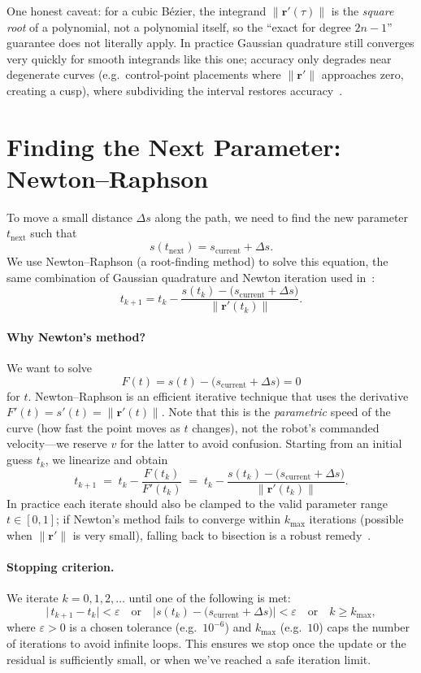 \documentclass[11pt]{article}
\begin{document}
One honest caveat: for a cubic B\'ezier, the integrand \(\|\mathbf r'(\tau)\|\) is the \emph{square root} of a polynomial, not a polynomial itself, so the ``exact for degree \(2n-1\)'' guarantee does not literally apply. In practice Gaussian quadrature still converges very quickly for smooth integrands like this one; accuracy only degrades near degenerate curves (e.g.\ control-point placements where \(\|\mathbf r'\|\) approaches zero, creating a cusp), where subdividing the interval restores accuracy~\cite{wang}.


\section{Finding the Next Parameter: Newton–Raphson}

To move a small distance \(\Delta s\) along the path, we need to find the new parameter \(t_{\text{next}}\) such that 
\[
s(t_{\text{next}}) = s_{\text{current}} + \Delta s.
\]
We use Newton–Raphson (a root-finding method) to solve this equation, the same combination of Gaussian quadrature and Newton iteration used in~\cite{wang}:
\[
t_{k+1} = t_k - \frac{s(t_k) - \bigl(s_{\text{current}}+\Delta s\bigr)}{\|\mathbf r'(t_k)\|}.
\]

\paragraph{Why Newton's method?} We want to solve
\[
F(t) = s(t) - \bigl(s_{\text{current}}+\Delta s\bigr) = 0
\]
for \(t\). Newton–Raphson is an efficient iterative technique that uses the derivative \(F'(t)=s'(t)=\|\mathbf r'(t)\|\). Note that this is the \emph{parametric} speed of the curve (how fast the point moves as \(t\) changes), not the robot's commanded velocity---we reserve \(v\) for the latter to avoid confusion. Starting from an initial guess \(t_k\), we linearize and obtain
\[
t_{k+1} \;=\; t_k - \frac{F(t_k)}{F'(t_k)}
\;=\; t_k - \frac{s(t_k) - \bigl(s_{\text{current}}+\Delta s\bigr)}{\|\mathbf r'(t_k)\|}.
\]
In practice each iterate should also be clamped to the valid parameter range \(t\in[0,1]\); if Newton's method fails to converge within \(k_{\max}\) iterations (possible when \(\|\mathbf r'\|\) is very small), falling back to bisection is a robust remedy~\cite{wang}.

\paragraph{Stopping criterion.} We iterate \(k=0,1,2,\dots\) until one of the following is met:
\[
\bigl|\,t_{k+1}-t_k\bigr| < \varepsilon
\quad\text{or}\quad
\bigl|s(t_k) - \bigl(s_{\text{current}}+\Delta s\bigr)\bigr| < \varepsilon
\quad\text{or}\quad
k \ge k_{\max},
\]
where \(\varepsilon>0\) is a chosen tolerance (e.g.\ \(10^{-6}\)) and \(k_{\max}\) (e.g.\ \(10\)) caps the number of iterations to avoid infinite loops. This ensures we stop once the update or the residual is sufficiently small, or when we’ve reached a safe iteration limit.
\end{document}
